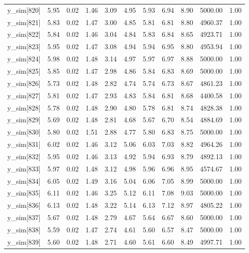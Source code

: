 \begin{table}[ht]
\begin{tabular}{rrrrrrrrrrr}
  y\_sim[820] & 5.95 & 0.02 & 1.46 & 3.09 & 4.95 & 5.93 & 6.94 & 8.90 & 5000.00 & 1.00 \\ 
  y\_sim[821] & 5.83 & 0.02 & 1.47 & 3.00 & 4.85 & 5.81 & 6.81 & 8.80 & 4960.37 & 1.00 \\ 
  y\_sim[822] & 5.84 & 0.02 & 1.46 & 3.04 & 4.84 & 5.83 & 6.84 & 8.65 & 4923.71 & 1.00 \\ 
  y\_sim[823] & 5.95 & 0.02 & 1.47 & 3.08 & 4.94 & 5.94 & 6.95 & 8.80 & 4953.94 & 1.00 \\ 
  y\_sim[824] & 5.98 & 0.02 & 1.48 & 3.14 & 4.97 & 5.97 & 6.97 & 8.88 & 5000.00 & 1.00 \\ 
  y\_sim[825] & 5.85 & 0.02 & 1.47 & 2.98 & 4.86 & 5.84 & 6.83 & 8.69 & 5000.00 & 1.00 \\ 
  y\_sim[826] & 5.73 & 0.02 & 1.48 & 2.82 & 4.74 & 5.74 & 6.73 & 8.67 & 4861.23 & 1.00 \\ 
  y\_sim[827] & 5.81 & 0.02 & 1.47 & 2.93 & 4.83 & 5.84 & 6.81 & 8.68 & 4400.58 & 1.00 \\ 
  y\_sim[828] & 5.78 & 0.02 & 1.48 & 2.90 & 4.80 & 5.78 & 6.81 & 8.74 & 4828.38 & 1.00 \\ 
  y\_sim[829] & 5.69 & 0.02 & 1.48 & 2.81 & 4.68 & 5.67 & 6.70 & 8.54 & 4884.69 & 1.00 \\ 
  y\_sim[830] & 5.80 & 0.02 & 1.51 & 2.88 & 4.77 & 5.80 & 6.83 & 8.75 & 5000.00 & 1.00 \\ 
  y\_sim[831] & 6.02 & 0.02 & 1.46 & 3.12 & 5.06 & 6.03 & 7.03 & 8.82 & 4964.26 & 1.00 \\ 
  y\_sim[832] & 5.95 & 0.02 & 1.46 & 3.13 & 4.92 & 5.94 & 6.93 & 8.79 & 4892.13 & 1.00 \\ 
  y\_sim[833] & 5.97 & 0.02 & 1.48 & 3.12 & 4.98 & 5.96 & 6.96 & 8.95 & 4574.67 & 1.00 \\ 
  y\_sim[834] & 6.05 & 0.02 & 1.49 & 3.16 & 5.04 & 6.06 & 7.05 & 8.99 & 5000.00 & 1.00 \\ 
  y\_sim[835] & 6.11 & 0.02 & 1.46 & 3.25 & 5.12 & 6.11 & 7.08 & 9.03 & 5000.00 & 1.00 \\ 
  y\_sim[836] & 6.13 & 0.02 & 1.48 & 3.22 & 5.14 & 6.13 & 7.12 & 8.97 & 4805.22 & 1.00 \\ 
  y\_sim[837] & 5.67 & 0.02 & 1.48 & 2.79 & 4.67 & 5.64 & 6.67 & 8.60 & 5000.00 & 1.00 \\ 
  y\_sim[838] & 5.59 & 0.02 & 1.47 & 2.74 & 4.61 & 5.60 & 6.57 & 8.47 & 5000.00 & 1.00 \\ 
  y\_sim[839] & 5.60 & 0.02 & 1.48 & 2.71 & 4.60 & 5.61 & 6.60 & 8.49 & 4997.71 & 1.00 \\ 

\end{tabular}
\end{table}
